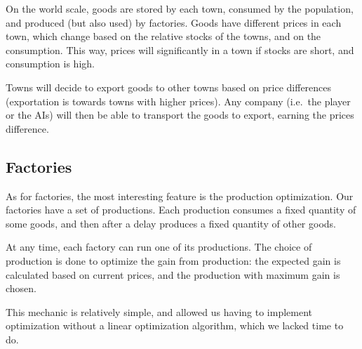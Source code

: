 \documentclass{article}
\begin{document}
On the world scale, goods are stored by each town, consumed by the population, and produced (but also used) by factories.
Goods have different prices in each town, which change based on the relative stocks of the towns, and on the consumption.
This way, prices will significantly in a town if stocks are short, and consumption is high.

Towns will decide to export goods to other towns based on price differences (exportation is towards towns with higher prices).
Any company (i.e.\ the player or the AIs) will then be able to transport the goods to export, earning the prices difference.

\subsection{Factories}
As for factories, the most interesting feature is the production optimization.
Our factories have a set of productions.
Each production consumes a fixed quantity of some goods, and then after a delay produces a fixed quantity of other goods.

At any time, each factory can run one of its productions.
The choice of production is done to optimize the gain from production: the expected gain is calculated based on current prices,
and the production with maximum gain is chosen.

This mechanic is relatively simple, and allowed us having to implement optimization without a linear optimization algorithm,
which we lacked time to do.
\end{document}
